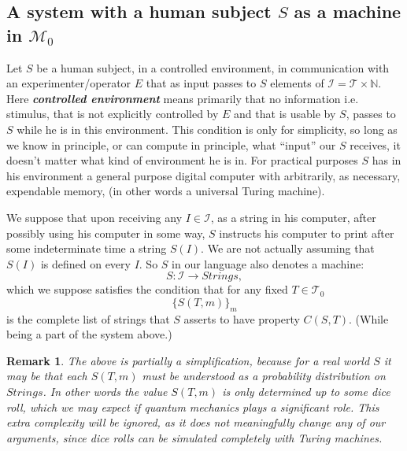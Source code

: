 \documentclass{amsart}  %
\numberwithin{equation}{section}
\newtheorem{remark}[equation]{Remark}
\theoremstyle{definition}
\theoremstyle{remark}
\begin{document}
{\subsection{A system with a human subject $S$ as a machine in $\mathcal{M} _{0}$}
\label{section:AsystemWithS}
Let $S$ be a human subject, in a controlled environment, in communication with an experimenter/operator $E$ that as input passes to $S$ elements of $\mathcal{I} = \mathcal{T} \times \mathbb{N}$. Here \textbf{\emph{controlled environment}} means primarily that no information i.e. stimulus,
that is not explicitly controlled by $E$ and that is usable by $S$, passes to $S$ while he is in this environment. This condition is only for simplicity, 
so long as we know in principle, or can compute in principle, what ``input'' our $S$ receives, it doesn't matter what kind of environment he is in.
For practical purposes $S$ has in his environment a general purpose digital computer with arbitrarily, as necessary, expendable memory, (in other words a universal Turing machine). 

We suppose that upon receiving any ${I} \in \mathcal{I} $, as a string in his computer, after possibly using his computer in some way,  $S$ instructs his computer to print after some indeterminate time a string $S (I)$.
We are not actually assuming that $S (I)$ is defined on every $I$. So $S$ in our language also denotes a machine: 
\begin{equation*}
   S: \mathcal{I} \to Strings,
\end{equation*} 
which we suppose satisfies the condition that for any fixed $T \in \mathcal{T} _{0}   $ $$\{S  (T,m)\} _{m} $$ is the complete list of strings that $S$ asserts to have property $C (S, T)$. (While being a part of the system above.) 
\begin{remark} \label{remark:simplification} The above is partially a simplification, because for a real world $S$ it may be that each $S (T,m)$ must be understood as a probability distribution on $Strings$. In other words the value $S (T,m)$ is only determined up to some dice roll, which we may expect if quantum mechanics plays a significant role. This extra complexity will be ignored,  as it does not meaningfully change any of our arguments, since dice rolls can be simulated completely with Turing machines.
\end{remark}

}
\end{document}
